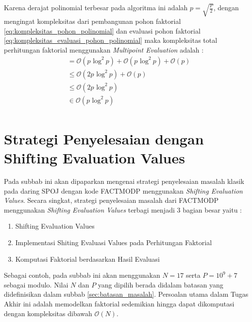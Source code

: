 Karena derajat polinomial terbesar pada algoritma ini adalah $ p = \sqrt{\frac{P}{2}} $, dengan mengingat kompleksitas dari pembangunan pohon faktorial \eqref{eq:kompleksitas_pohon_polinomial} dan evaluasi pohon faktorial \eqref{eq:kompleksitas_evaluasi_pohon_polinomial} maka kompleksitas total perhitungan faktorial menggunakan \textit{Multipoint Evaluation} adalah :
\begin{equation}
	\begin{aligned}
		&= \mathcal{O}{(p \text{ log}^2\ p)} + \mathcal{O}{(p \text{ log}^2\ p)} + \mathcal{O}{(p)} \\
		&\leq \mathcal{O}{(2p \text{ log}^2\ p)} + \mathcal{O}{(p)} \\
		&\leq \mathcal{O}{(2p \text{ log}^2\ p)} \\
		&\in \mathcal{O}{(p \text{ log}^2\ p)} \\
	\end{aligned}
	\label{eq:kompleksitas_multipoint_eval_faktorial}
\end{equation}

\newpage

\section{Strategi Penyelesaian dengan Shifting Evaluation Values}
Pada subbab ini akan dipaparkan mengenai strategi penyelesaian masalah klasik pada daring SPOJ dengan kode FACTMODP menggunakan \textit{Shifting Evaluation Values}. Secara singkat, strategi penyelesaian masalah dari FACTMODP menggunakan \textit{Shifting Evaluation Values} terbagi menjadi 3 bagian besar yaitu :
\begin{enumerate}
	\item Shifting Evaluation Values
	\item Implementasi Shiting Evaluasi Values pada Perhitungan Faktorial
	\item Komputasi Faktorial berdasarkan Hasil Evaluasi
\end{enumerate}

Sebagai contoh, pada subbab ini akan menggunakan $ N = 17 $ serta $ P = 10^9 + 7 $ sebagai modulo. Nilai $ N $ dan $ P $ yang dipilih berada didalam batasan yang didefinisikan dalam subbab \ref{sec:batasan_masalah}. Persoalan utama dalam Tugas Akhir ini adalah memodelkan faktorial sedemikian hingga dapat dikomputasi dengan kompleksitas dibawah $ \mathcal{O}{(N)} $.

